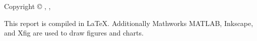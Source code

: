 \thispagestyle{empty}
{\small
\strut\vfill %
\noindent Copyright \copyright{} \projectGroup{}, \projectFaculty{} \projectSemester{}, \AAU{} \the\year\par
\vspace{0.2cm}
\noindent This report is compiled in \LaTeX. Additionally Mathworks MATLAB\textsuperscript{\textregistered}, Inkscape, and Xfig are used to draw figures and charts.
}
\clearpage
